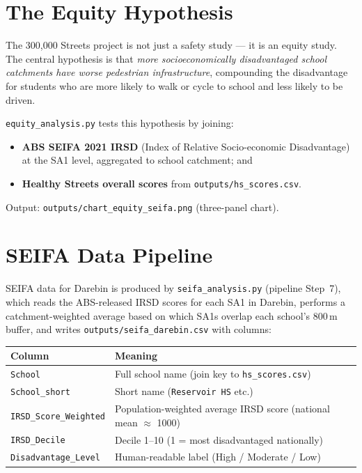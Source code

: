 \documentclass[11pt,a4paper,openany]{book}
\begin{document}
\section{The Equity Hypothesis}

The 300,000 Streets project is not just a safety study --- it is an equity study.
The central hypothesis is that \emph{more socioeconomically disadvantaged school catchments
have worse pedestrian infrastructure}, compounding the disadvantage for students who are
more likely to walk or cycle to school and less likely to be driven.

\texttt{equity\_analysis.py} tests this hypothesis by joining:

\begin{itemize}
  \item \textbf{ABS SEIFA 2021 IRSD} (Index of Relative Socio-economic Disadvantage) at the
        SA1 level, aggregated to school catchment; and
  \item \textbf{Healthy Streets overall scores} from \texttt{outputs/hs\_scores.csv}.
\end{itemize}

Output: \texttt{outputs/chart\_equity\_seifa.png} (three-panel chart).

\section{SEIFA Data Pipeline}

SEIFA data for Darebin is produced by \texttt{seifa\_analysis.py} (pipeline Step~7),
which reads the ABS-released IRSD scores for each SA1 in Darebin, performs a
catchment-weighted average based on which SA1s overlap each school's 800\,m buffer,
and writes \texttt{outputs/seifa\_darebin.csv} with columns:

\begin{center}
\begin{tabular}{lL{8cm}}
\toprule
Column & Meaning \\
\midrule
\texttt{School} & Full school name (join key to \texttt{hs\_scores.csv}) \\
\texttt{School\_short} & Short name (\texttt{Reservoir HS} etc.) \\
\texttt{IRSD\_Score\_Weighted} & Population-weighted average IRSD score (national mean $\approx$ 1000) \\
\texttt{IRSD\_Decile} & Decile 1--10 (1 = most disadvantaged nationally) \\
\texttt{Disadvantage\_Level} & Human-readable label (High / Moderate / Low) \\
\bottomrule
\end{tabular}
\end{center}
\end{document}
